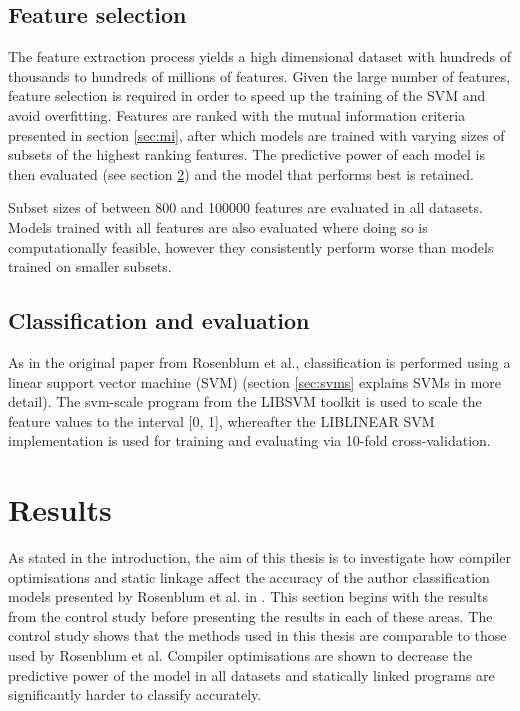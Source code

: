 \documentclass[a4paper,11pt]{kth-mag}
\begin{document}
\section{Feature selection}
The feature extraction process yields a high dimensional dataset with hundreds
of thousands to hundreds of millions of features. Given the large number of
features, feature selection is required in order to speed up the training of
the SVM and avoid overfitting. Features are ranked with the mutual information
criteria presented in section \ref{sec:mi}, after which models are trained with
varying sizes of subsets of the highest ranking features. The predictive power
of each model is then evaluated (see section \ref{sec:c-e}) and the model that
performs best is retained.

Subset sizes of between 800 and 100000 features are evaluated in all datasets.
Models trained with all features are also evaluated where doing so is
computationally feasible, however they consistently perform worse than models
trained on smaller subsets.

\section{Classification and evaluation}
\label{sec:c-e}
As in the original paper from Rosenblum et al., classification is performed
using a linear support vector machine (SVM) (section \ref{sec:svms} explains
SVMs in more detail). The svm-scale program from the LIBSVM toolkit is used
\parencite{chang2011libsvm} to scale the feature values to the interval [0, 1],
whereafter the LIBLINEAR SVM implementation \parencite{fan2008liblinear} is
used for training and evaluating via 10-fold cross-validation.

\chapter{Results}
As stated in the introduction, the aim of this thesis is to investigate how
compiler optimisations and static linkage affect the accuracy of the author
classification models presented by Rosenblum et al. in
\parencite{rosenblum2011wrote}. This section begins with the results from the
control study before presenting the results in each of these areas. The control
study shows that the methods used in this thesis are comparable to those used
by Rosenblum et al. Compiler optimisations are shown to decrease the predictive
power of the model in all datasets and statically linked programs are
significantly harder to classify accurately.
\end{document}
